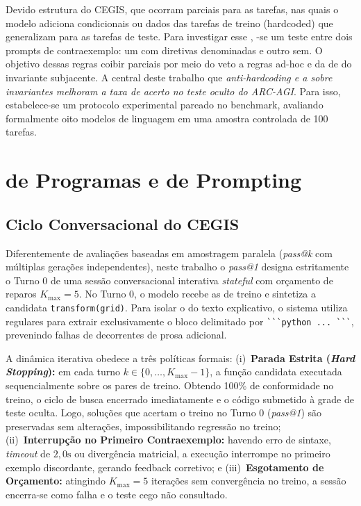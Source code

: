 \documentclass[letterpaper]{article} %
\begin{document}
Devido \a{} estrutura do CEGIS, \e{} \possivel{} que ocorram \solucoes{} parciais para as tarefas, nas quais o modelo adiciona condicionais ou dados \especificos{} das tarefas de treino (hardcoded) que \nao{} generalizam para as tarefas de teste. Para investigar esse \fenomeno{}, \propoe{}-se um teste entre dois prompts de contraexemplo: um com diretivas denominadas \AntiTrapaca{} e outro sem. O objetivo dessas regras \e{} coibir \memorizacoes{} parciais por meio do veto a regras ad-hoc e da \exigencia{} de \verbalizacao{} do invariante subjacente. A \hipotese{} central deste trabalho \e{} que \textit{\restricoes{} \semanticas{} anti-hardcoding e a  \explicita{} sobre invariantes melhoram a taxa de acerto no teste oculto do ARC-AGI}. Para isso, estabelece-se um protocolo experimental pareado no benchmark, avaliando formalmente oito modelos de linguagem em uma amostra controlada de 100 tarefas.

\section{\Sintese{} de Programas e \Variacoes{} de Prompting}
\label{sec:metodo}

\subsection{Ciclo Conversacional do CEGIS \Semantico{}}
Diferentemente de avalia{\c{c}}{\~o}es baseadas em amostragem paralela (\textit{pass@k} com m{\'{u}}ltiplas gera{\c{c}}{\~o}es independentes), neste trabalho o \textit{pass@1} designa estritamente o Turno 0 de uma sess{\~a}o conversacional interativa \textit{stateful} com or{\c{c}}amento de reparos $K_{\max} = 5$. No Turno 0, o modelo recebe as \demonstracoes{} de treino e sintetiza a \funcao{} candidata \texttt{transform(grid)}. Para isolar o \codigo{} \executavel{} do texto explicativo, o sistema utiliza \expressoes{} regulares para extrair exclusivamente o bloco delimitado por \texttt{\`{}\`{}\`{}python ... \`{}\`{}\`{}}, prevenindo falhas de \interpretacao{} decorrentes de prosa adicional.

A din{\^{a}}mica iterativa obedece a tr{\^{e}}s pol{\'{i}}ticas formais: (i)~\textbf{Parada Estrita (\textit{Hard Stopping}):} em cada turno $k \in \{0, \dots, K_{\max}-1\}$, a fun{\c{c}}{\~a}o candidata \e{} executada sequencialmente sobre os pares de treino. Obtendo 100\% de conformidade no treino, o ciclo de busca \e{} encerrado imediatamente e o c{\'{o}}digo \e{} submetido {\`{a}} grade de teste oculta. Logo, solu{\c{c}}{\~o}es que acertam o treino no Turno 0 (\textit{pass@1}) s{\~a}o preservadas sem altera{\c{c}}{\~o}es, impossibilitando regress{\~a}o no treino; (ii)~\textbf{Interrup{\c{c}}{\~a}o no Primeiro Contraexemplo:} havendo erro de sintaxe, \textit{timeout} de $2{,}0\text{s}$ ou diverg{\^{e}}ncia matricial, a execu{\c{c}}{\~a}o interrompe no primeiro exemplo discordante, gerando feedback corretivo; e (iii)~\textbf{Esgotamento de Or{\c{c}}amento:} atingindo $K_{\max} = 5$ itera{\c{c}}{\~o}es sem converg{\^{e}}ncia no treino, a sess{\~a}o encerra-se como falha e o teste cego n{\~a}o \e{} consultado.
\end{document}
